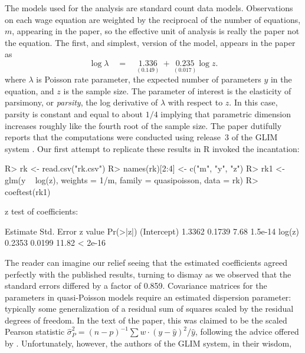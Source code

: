 \documentclass[10pt,a4paper,twoside]{article}
\let\proglang=\textsf
\newenvironment{Schunk}{}{}
\begin{document}
The models used for the analysis are standard count data models.  Observations 
on each wage equation are weighted by the reciprocal of the number of equations, $m$,
appearing in the paper, so the effective unit of analysis is really the paper not 
the equation.  The first, and simplest, version of the model, appears in the paper as
\begin{equation}
  \log \lambda \quad = \quad  \underset{(0.149)}{1.336} ~+~ \underset {(0.017)}{0.235} \log z.
\end{equation}
where $\lambda$ is Poisson rate parameter, the expected number of parameters $y$ in
the equation, and $z$ is the sample size.  The parameter of interest is the
elasticity of parsimony, or \emph{parsity}, the log derivative of $\lambda$ with respect
to $z$.   In this case, parsity is constant and equal to about $1/4$ implying
that parametric dimension increases roughly like the fourth root of the
sample size.  The paper dutifully reports that the computations were conducted
using release~3 of the \proglang{GLIM} system \citep{repro:Baker+Nelder:1978}.
Our first attempt to replicate these results in \proglang{R} invoked the incantation:
%
\begin{Schunk}
\begin{Sinput}
R> rk <- read.csv("rk.csv")
R> names(rk)[2:4] <- c("m", "y", "z")
R> rk1 <- glm(y ~ log(z), weights = 1/m, family = quasipoisson, data = rk)
R> coeftest(rk1)
\end{Sinput}
\begin{Soutput}
z test of coefficients:

            Estimate Std. Error z value Pr(>|z|)
(Intercept)   1.3362     0.1739    7.68  1.5e-14
log(z)        0.2353     0.0199   11.82  < 2e-16
\end{Soutput}
\end{Schunk}
%
%
The reader can imagine our relief seeing that the estimated coefficients
agreed perfectly with the published results, turning to dismay as we observed
that the standard errors differed by a factor of 
0.859.  
Covariance matrices for the parameters in quasi-Poisson models require 
an estimated dispersion parameter:
typically some generalization of a residual sum of squares scaled by the
residual degrees of freedom. In the text of the paper, this was claimed
to be the scaled Pearson statistic
$\hat \sigma_P^2 = (n-p)^{-1} \sum w \cdot (y - \hat y)^2 / \hat y$,
following the advice offered by \citet[pp.~172--173]{repro:McCullagh+Nelder:1983}.
Unfortunately, however, the authors of the \proglang{GLIM} system, in their wisdom,  
\end{document}
